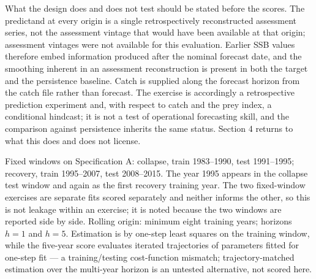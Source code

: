\documentclass[11pt]{article}
\begin{document}
What the design does and does not test should be stated before the
scores. The predictand at every origin is a single retrospectively
reconstructed assessment series, not the assessment vintage that would
have been available at that origin; assessment vintages were not available for this
evaluation. Earlier SSB values therefore embed information produced
after the nominal forecast date, and the smoothing inherent in an
assessment reconstruction is present in both the target and the
persistence baseline. Catch is supplied along the forecast horizon from
the catch file rather than forecast. The exercise is accordingly
a retrospective prediction experiment and, with respect to catch and the
prey index, a conditional hindcast; it is not a test of operational
forecasting skill, and the comparison against persistence inherits the
same status. Section 4 returns to what this does and does not license.

Fixed windows on Specification A: collapse, train 1983--1990, test
1991--1995; recovery, train 1995--2007, test 2008--2015. The year 1995
appears in the collapse test window and again as the first recovery
training year. The two fixed-window exercises are separate fits scored
separately and neither informs the other, so this is not leakage within
an exercise; it is noted because the two windows are reported side by
side. Rolling origin:
minimum eight training years; horizons \(h=1\) and \(h=5\). Estimation
is by one-step least squares on the training window, while the five-year
score evaluates iterated trajectories of parameters fitted for one-step
fit --- a training/testing cost-function mismatch;
trajectory-matched estimation over the multi-year horizon is an
untested alternative, not scored here.
\end{document}
